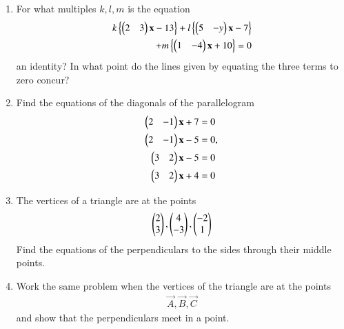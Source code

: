 \begin{enumerate}[label=\arabic*.,ref=\thesubsection.\theenumi]
\item For what multiples $k, l, m$ is the equation
\begin{align}
k\left\{\begin{pmatrix}2&3\end{pmatrix}\mathbf{x}-13\right\}+l\left\{\begin{pmatrix}5& -y\end{pmatrix}\mathbf{x}-7\right\} 
\nonumber \\ 
+ m\left\{\begin{pmatrix}1 &-4\end{pmatrix}\mathbf{x}+10\right\} = 0
\end{align}
an identity?  In what point do the lines given by equating the three terms to zero concur?
\item Find the equations of the diagonals of the parallelogram
\begin{align}
\begin{pmatrix}2&-1\end{pmatrix} \mathbf{x}+7&= 0
\\
\begin{pmatrix} 2 &-1\end{pmatrix}\mathbf{x}-5 &= 0,
\\
\begin{pmatrix} 3 &2\end{pmatrix}\mathbf{x}-5 &= 0
\\
\begin{pmatrix} 3 &2\end{pmatrix}\mathbf{x}+4&=0 
\end{align}
\item The vertices of a triangle are at the points
\begin{align}
\begin{pmatrix}2\\3\end{pmatrix}, \begin{pmatrix}4\\-3\end{pmatrix}, \begin{pmatrix}-2\\1\end{pmatrix}
\end{align}
Find the equations of the perpendiculars to the sides through their middle points.
\item Work the same problem when the vertices of the triangle are at the points
\begin{align}
\vec{A},
\vec{B},
\vec{C}
\end{align}
and show that the perpendiculars meet in a point.

\end{enumerate}
